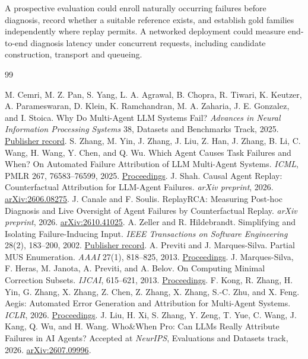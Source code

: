 \documentclass[11pt,letterpaper]{article}
\begin{document}
A prospective evaluation could enroll naturally occurring failures before diagnosis, record whether a suitable reference exists, and establish gold families independently where replay permits. A networked deployment could measure end-to-end diagnosis latency under concurrent requests, including candidate construction, transport and queueing.
\begin{thebibliography}{99}\small\raggedright
{} M. Cemri, M. Z. Pan, S. Yang, L. A. Agrawal, B. Chopra, R. Tiwari, K. Keutzer, A. Parameswaran, D. Klein, K. Ramchandran, M. A. Zaharia, J. E. Gonzalez, and I. Stoica. Why Do Multi-Agent LLM Systems Fail? \emph{Advances in Neural Information Processing Systems} 38, Datasets and Benchmarks Track, 2025. \href{https://doi.org/10.52202/085713-4082}{Publisher record}.
 S. Zhang, M. Yin, J. Zhang, J. Liu, Z. Han, J. Zhang, B. Li, C. Wang, H. Wang, Y. Chen, and Q. Wu. Which Agent Causes Task Failures and When? On Automated Failure Attribution of LLM Multi-Agent Systems. \emph{ICML}, PMLR 267, 76583--76599, 2025. \href{https://proceedings.mlr.press/v267/zhang25cq.html}{Proceedings}.
 J. Shah. Causal Agent Replay: Counterfactual Attribution for LLM-Agent Failures. \emph{arXiv preprint}, 2026. \href{https://arxiv.org/abs/2606.08275}{arXiv:2606.08275}.
 J. Canale and F. Soulis. ReplayRCA: Measuring Post-hoc Diagnosis and Live Oversight of Agent Failures by Counterfactual Replay. \emph{arXiv preprint}, 2026. \href{https://arxiv.org/abs/2610.41025}{arXiv:2610.41025}.
 A. Zeller and R. Hildebrandt. Simplifying and Isolating Failure-Inducing Input. \emph{IEEE Transactions on Software Engineering} 28(2), 183--200, 2002. \href{https://ieeexplore.ieee.org/document/988498}{Publisher record}.
 A. Previti and J. Marques-Silva. Partial MUS Enumeration. \emph{AAAI} 27(1), 818--825, 2013. \href{https://doi.org/10.1609/aaai.v27i1.8657}{Proceedings}.
 J. Marques-Silva, F. Heras, M. Janota, A. Previti, and A. Belov. On Computing Minimal Correction Subsets. \emph{IJCAI}, 615--621, 2013. \href{https://ijcai.org/proceedings/2013/98}{Proceedings}.
 F. Kong, R. Zhang, H. Yin, G. Zhang, X. Zhang, Z. Chen, Z. Zhang, X. Zhang, S.-C. Zhu, and X. Feng. Aegis: Automated Error Generation and Attribution for Multi-Agent Systems. \emph{ICLR}, 2026. \href{https://openreview.net/forum?id=zqcYoxXiN3}{Proceedings}.
 J. Liu, H. Xi, S. Zhang, Y. Zeng, T. Yue, C. Wang, J. Kang, Q. Wu, and H. Wang. Who\&When Pro: Can LLMs Really Attribute Failures in AI Agents? Accepted at \emph{NeurIPS}, Evaluations and Datasets track, 2026. \href{https://arxiv.org/abs/2607.09996}{arXiv:2607.09996}.

\end{thebibliography}
\end{document}
